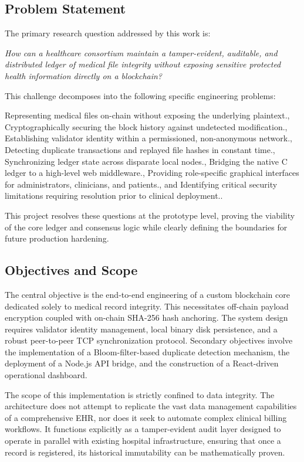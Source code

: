 \documentclass[12pt]{article}
\begin{document}
\subsection{Problem Statement}

The primary research question addressed by this work is:

\textit{How can a healthcare consortium maintain a tamper-evident, auditable, and distributed ledger of medical file integrity without exposing sensitive protected health information directly on a blockchain?}

This challenge decomposes into the following specific engineering problems:

 Representing medical files on-chain without exposing the underlying plaintext., Cryptographically securing the block history against undetected modification., Establishing validator identity within a permissioned, non-anonymous network., Detecting duplicate transactions and replayed file hashes in constant time., Synchronizing ledger state across disparate local nodes., Bridging the native C ledger to a high-level web middleware., Providing role-specific graphical interfaces for administrators, clinicians, and patients., and Identifying critical security limitations requiring resolution prior to clinical deployment..

This project resolves these questions at the prototype level, proving the viability of the core ledger and consensus logic while clearly defining the boundaries for future production hardening.

\subsection{Objectives and Scope}

The central objective is the end-to-end engineering of a custom blockchain core dedicated solely to medical record integrity. This necessitates off-chain payload encryption coupled with on-chain SHA-256 hash anchoring. The system design requires validator identity management, local binary disk persistence, and a robust peer-to-peer TCP synchronization protocol. Secondary objectives involve the implementation of a Bloom-filter-based duplicate detection mechanism, the deployment of a Node.js API bridge, and the construction of a React-driven operational dashboard.

The scope of this implementation is strictly confined to data integrity. The architecture does not attempt to replicate the vast data management capabilities of a comprehensive EHR, nor does it seek to automate complex clinical billing workflows. It functions explicitly as a tamper-evident audit layer designed to operate in parallel with existing hospital infrastructure, ensuring that once a record is registered, its historical immutability can be mathematically proven.
\end{document}
